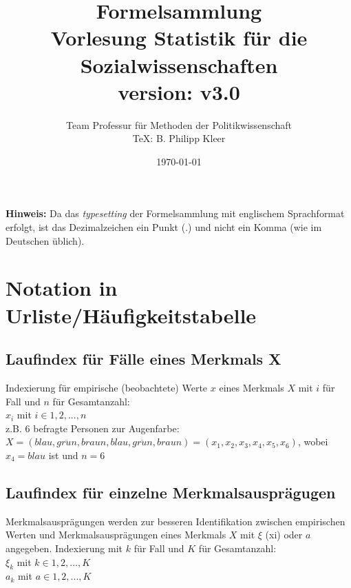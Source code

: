 \documentclass[11pt,a4paper]{article}
\begin{document}
\begin{titlepage}
\title{Formelsammlung \\ Vorlesung \textbf{Statistik für die Sozialwissenschaften} \\ {\footnotesize version: v3.0}}
\author{Team Professur für Methoden der Politikwissenschaft \\ \TeX: B. Philipp Kleer}
\date{\today} 
\maketitle

\textbf{Hinweis:} Da das \textit{typesetting} der Formelsammlung mit englischem Sprachformat erfolgt, ist das Dezimalzeichen ein Punkt ($.$) und nicht ein Komma (wie im Deutschen üblich).

\tableofcontents

\end{titlepage}

\section{Notation in Urliste/Häufigkeitstabelle}
\subsection{Laufindex für Fälle eines Merkmals X}
Indexierung für empirische (beobachtete) Werte $x$ eines Merkmals $X$ mit $i$ für Fall und $n$ für Gesamtanzahl: \\
$x_i$ mit $i \in 1, 2, ..., n$ \\

z.B. 6 befragte Personen zur Augenfarbe: 
$X = (blau, gr\ddot{u}n, braun, blau, gr\ddot{u}n, braun) = (x_1, x_2, x_3, x_4, x_5, x_6)$, wobei $x_4 = blau$ ist und $n = 6$ \\

\subsection{Laufindex für einzelne Merkmalsausprägugen}
Merkmalsausprägungen werden zur besseren Identifikation zwischen empirischen Werten und Merkmalsausprägungen eines Merkmals $X$ mit $\xi$ (xi) oder $a$ angegeben. 
Indexierung mit $k$ für Fall und $K$ für Gesamtanzahl:  \\
$\xi_k$ mit $k \in 1, 2, ..., K$\\
$a_k$ mit $a \in 1, 2, ..., K$
\newline
\end{document}
